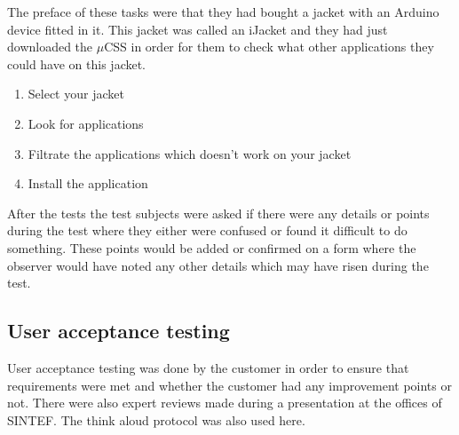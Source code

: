 		The preface of these tasks were that they had bought a jacket with an Arduino device fitted in it. This jacket was called an iJacket and they had just downloaded the $\mu$CSS in order for them to check what other applications they could have on this jacket.

		\begin{enumerate}
		 \item Select your jacket
		 \item Look for applications
		 \item Filtrate the applications which doesn't work on your jacket
		 \item Install the application
		\end{enumerate}

		After the tests the test subjects were asked if there were any details or points during the test where they either were confused or found it difficult to do something. These points would be added or confirmed on a form where the observer would have noted any other details which may have risen during the test.


		\subsection{User acceptance testing}
			User acceptance testing was done by the customer in order to ensure that requirements were met and whether the customer had any improvement points or not. There were also expert reviews made during a presentation at the offices of SINTEF. The think aloud protocol was also used here.


